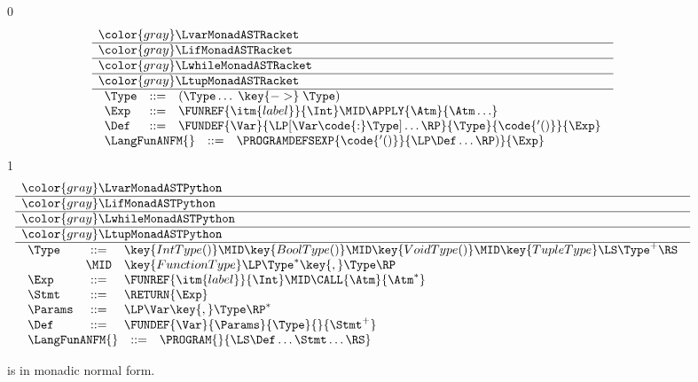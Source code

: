 \documentclass[7x10]{TimesAPriori_MIT}%
\newcommand{\gray}[1]{{\color{gray} #1}}
\def\racketEd{0}
\def\pythonEd{1}
\providecommand{\BookEdition}{1}
\let\edition\BookEdition
\newcommand{\pythonColor}[0]{}
\numberwithin{theorem}{chapter}
\numberwithin{definition}{chapter}
\numberwithin{equation}{chapter}
\begin{document}
\newcommand{\LfunMonadASTRacket}{
  \begin{array}{lcl}
  \Type &::=& (\Type \ldots \; \key{->}\; \Type) \\
  \Exp &::=& \FUNREF{\itm{label}}{\Int} \MID \APPLY{\Atm}{\Atm\ldots}\\
  \Def &::=& \FUNDEF{\Var}{\LP[\Var \code{:} \Type]\ldots\RP}{\Type}{\code{'()}}{\Exp}
  \end{array}
}

\newcommand{\LfunMonadASTPython}{
  \begin{array}{lcl}
    \Type &::=& \key{IntType()} \MID \key{BoolType()} \MID \key{VoidType()}
        \MID \key{TupleType}\LS\Type^+\RS\\
        &\MID& \key{FunctionType}\LP \Type^{*} \key{, } \Type \RP \\
    \Exp &::=& \FUNREF{\itm{label}}{\Int} \MID \CALL{\Atm}{\Atm^{*}}\\
    \Stmt &::=& \RETURN{\Exp} \\
   \Params &::=&  \LP\Var\key{,}\Type\RP^* \\
   \Def &::=& \FUNDEF{\Var}{\Params}{\Type}{}{\Stmt^{+}} 
  \end{array}
}

\begin{figure}[tp]
\centering
\begin{tcolorbox}[colback=white]
\footnotesize
{\if\edition\racketEd    
\[
\begin{array}{l}
  \gray{\LvarMonadASTRacket} \\ \hline
  \gray{\LifMonadASTRacket} \\ \hline
  \gray{\LwhileMonadASTRacket} \\ \hline
  \gray{\LtupMonadASTRacket} \\ \hline
  \LfunMonadASTRacket \\
\begin{array}{rcl}
\LangFunANFM{}  &::=& \PROGRAMDEFSEXP{\code{'()}}{\LP\Def\ldots\RP)}{\Exp}
\end{array}
\end{array}
\]
\fi}
{\if\edition\pythonEd\pythonColor
\[
\begin{array}{l}
  \gray{\LvarMonadASTPython} \\ \hline
  \gray{\LifMonadASTPython} \\ \hline
  \gray{\LwhileMonadASTPython} \\ \hline
  \gray{\LtupMonadASTPython} \\ \hline
  \LfunMonadASTPython \\
  \begin{array}{rcl}
     \LangFunANFM{} &::=& \PROGRAM{}{\LS \Def \ldots \Stmt \ldots \RS}
  \end{array}
\end{array}
\]
\fi}
\end{tcolorbox}

\caption{\LangFunANF{} is \LangFunRef{} in monadic normal form.}
\label{fig:Lfun-anf-syntax}
\end{figure}
\end{document}
